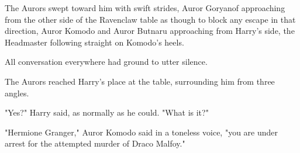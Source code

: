 The Aurors swept toward him with swift strides, Auror Goryanof approaching from
the other side of the Ravenclaw table as though to block any escape in that
direction, Auror Komodo and Auror Butnaru approaching from Harry's side, the
Headmaster following straight on Komodo's heels.

All conversation everywhere had ground to utter silence.

The Aurors reached Harry's place at the table, surrounding him from three
angles.

"Yes?" Harry said, as normally as he could. "What is it?"

"Hermione Granger," Auror Komodo said in a toneless voice, "you are under
arrest for the attempted murder of Draco Malfoy."
